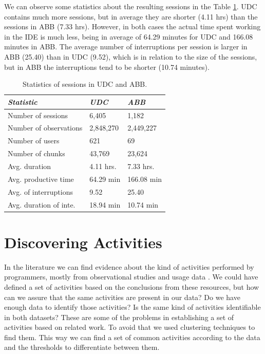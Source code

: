 \documentclass[conference]{IEEEtran}
\begin{document}
We can observe some statistics about the resulting sessions in the Table \ref{tbl:stats_sessions}. UDC contains much more sessions, but in average they are shorter (4.11 hrs) than the sessions in ABB (7.33 hrs). However, in both cases the actual time spent working in the IDE is much less, being in average of 64.29 minutes for UDC and 166.08 minutes in ABB. The average number of interruptions per session is larger in ABB (25.40) than in UDC (9.52), which is in relation to the size of the sessions, but in ABB the interruptions tend to be shorter (10.74 minutes).

\begin{table}[ht!]
	\small
	\caption{Statistics of sessions in UDC and ABB. }
	\label{tbl:stats_sessions}
	\centering
	\begin{tabular}{|p{3.5cm}|p{2cm}|p{2cm}|} 
		\hline
		\emph{Statistic} & \emph{UDC} & \emph{ABB} \\
		\hline
		\hline
		Number of sessions & 6,405 & 1,182 \\
		\hline
		Number of observations & 2,848,270 & 2,449,227 \\
		\hline
		Number of users & 621 & 69 \\
		\hline
		Number of chunks & 43,769 & 23,624 \\
		\hline
		Avg. duration & 4.11 hrs. & 7.33 hrs. \\
		\hline
		Avg. productive time & 64.29 min & 166.08 min \\
		\hline
		Avg. of interruptions & 9.52 & 25.40 \\
		\hline
		Avg. duration of inte. & 18.94 min & 10.74 min \\
		\hline
	\end{tabular}
\end{table}

\section{Discovering Activities}

In the literature we can find evidence about the kind of activities performed by programmers, mostly from observational studies and usage data \cite{LVD06, GM04, MMLK14, MKF06}. We could have defined a set of activities based on the conclusions from these resources, but how can we assure that the same activities are present in our data? Do we have enough data to identify those activities? Is the same kind of activities identifiable in both datasets? These are some of the problems in establishing a set of activities based on related work. To avoid that we used clustering techniques to find them. This way we can find a set of common activities according to the data and the thresholds to differentiate between them.
\end{document}
